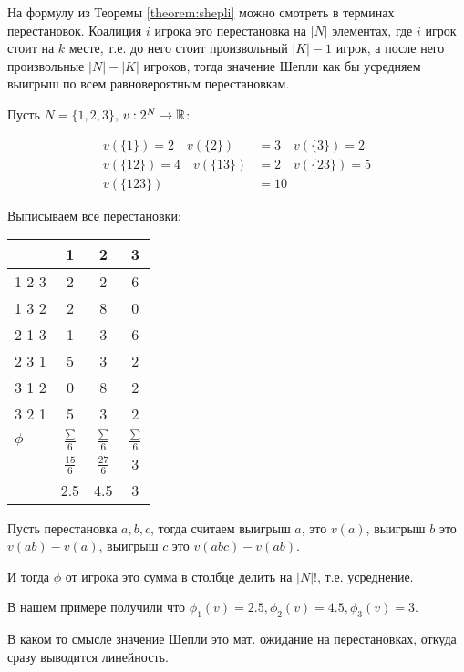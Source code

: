 \documentclass[../main.tex]{subfiles}
\begin{document}
На формулу из Теоремы \ref{theorem:shepli} можно смотреть в терминах перестановок.
Коалиция $i$ игрока это перестановка на  $|N|$ элементах, где  $i$ игрок стоит на  $k$ месте, т.е. до него стоит произвольный  $|K| - 1$ игрок, а после него произвольные $|N| - |K|$ игроков, тогда значение Шепли как бы усредняем выигрыш по всем равновероятным перестановкам.

 \begin{exmpl}
	 Пусть $N = \{1, 2, 3\}$,  $v : 2^{N} \to \mathbb{R}$:

	 \begin{align*}
		 v(\{1\}) = 2 \quad v(\{2\}) &= 3 \quad v(\{3\}) = 2 \\
		 v(\{12\}) = 4 \quad v(\{13\}) &= 2 \quad v(\{23\}) = 5 \\
		 v(\{123\}) &= 10
 	 \end{align*}

	 Выписываем все перестановки:


		{ \centering
\renewcommand{\arraystretch}{1.3}
			\begin{tabular}{l|ccc}
			  & 1 & 2 & 3\\
			  \hline
				1 2 3  & 2 & 2 & 6 \\
				1 3 2 & 2 & 8 & 0 \\
				2 1 3 & 1 & 3 &  6\\
				2 3 1 & 5 & 3 & 2\\
				3 1 2 & 0 & 8 & 2 \\
				3 2 1 & 5 & 3 & 2 \\
				$\phi$ &  $\frac{\sum}{6}$ & $\frac{\sum}{6}$ & $\frac{\sum}{6}$ \\
					   & $\frac{15}{6}$ & $\frac{27}{6}$ & $3$ \\
					   & 2.5 & 4.5 & 3
			\end{tabular}\par
		}

		Пусть перестановка $a, b, c$, тогда считаем выигрыш  $a$, это $v(a)$, выигрыш  $b$ это  $v(ab) - v(a)$, выигрыш  $c$ это  $v(abc) - v(ab)$. 

		И тогда $\phi$ от игрока это сумма в столбце делить на  $|N|!$, т.е. усреднение.

		В нашем примере получили что $\phi_1(v) = 2.5, \phi_2(v) = 4.5, \phi_3(v) = 3$.

		В каком то смысле значение Шепли это мат. ожидание на перестановках, откуда сразу выводится линейность.

	 
\end{exmpl}
\end{document}
